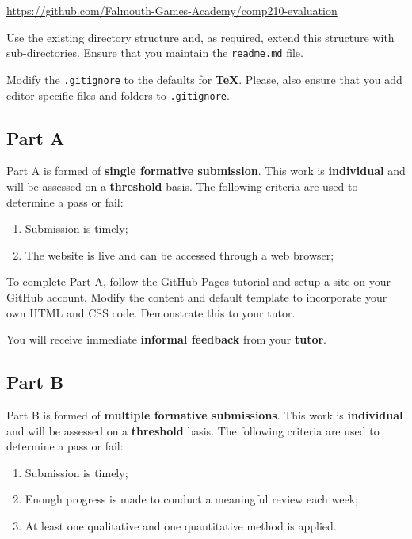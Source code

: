 \documentclass{../fal_assignment}
\begin{document}
\indent \url{https://github.com/Falmouth-Games-Academy/comp210-evaluation}

Use the existing directory structure and, as required, extend this structure with sub-directories. Ensure that you maintain the \texttt{readme.md} file.

Modify the \texttt{.gitignore} to the defaults for \textbf{TeX}. Please, also ensure that you add editor-specific files and folders to \texttt{.gitignore}. 

\subsection*{Part A}

Part A is formed of \textbf{single formative submission}. This work is \textbf{individual} and will be assessed on a \textbf{threshold} basis. The following criteria are used to determine a pass or fail:

\begin{enumerate}[label=(\alph*)]
	\item Submission is timely;
	\item The website is live and can be accessed through a web browser;
\end{enumerate}

To complete Part A, follow the GitHub Pages tutorial and setup a site on your GitHub account.  Modify the content and default template to incorporate your own HTML and CSS code. Demonstrate this to your tutor.

You will receive immediate \textbf{informal feedback} from your \textbf{tutor}.

\subsection*{Part B}

Part B is formed of \textbf{multiple formative submissions}. This work is \textbf{individual} and will be assessed on a \textbf{threshold} basis. The following criteria are used to determine a pass or fail:

\begin{enumerate}[label=(\alph*)]
	\item Submission is timely;
	\item Enough progress is made to conduct a meaningful review each week;
	\item At least one qualitative and one quantitative method is applied.
\end{enumerate}
\end{document}
